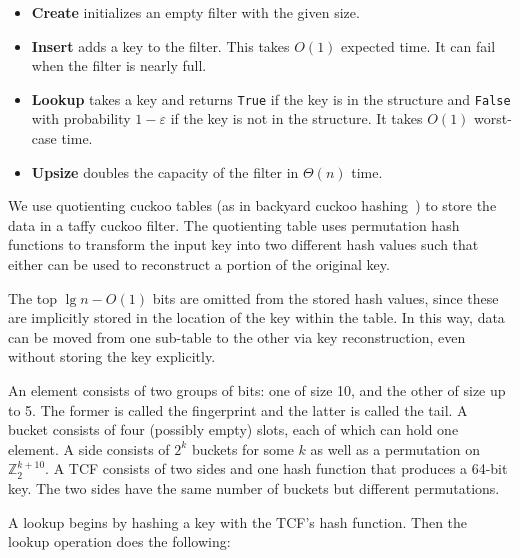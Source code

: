 \documentclass[manuscript,screen,review]{acmart}
\newcommand{\ints}{\mathbb{Z}}
\begin{document}
\begin{itemize}
\item {\bf Create} initializes an empty filter with the given size.
\item {\bf Insert} adds a key to the filter.
  This takes $O(1)$ expected time.
  It can fail when the filter is nearly full.
\item {\bf Lookup} takes a key and returns \verb|True| if the key is in the structure and \verb|False| with probability $1-\varepsilon$ if the key is not in the structure.
  It takes $O(1)$ worst-case time.
\item {\bf Upsize} doubles the capacity of the filter in $\Theta(n)$ time.
\end{itemize}

We use quotienting cuckoo tables (as in backyard cuckoo hashing~\cite{backyard}) to store the data in a taffy cuckoo filter.
The quotienting table uses permutation hash functions to transform the input key into two different hash values such that either can be used to reconstruct a portion of the original key.

The top $\lg n - O(1)$ bits are omitted from the stored hash values, since these are implicitly stored in the location of the key within the table.
In this way, data can be moved from one sub-table to the other via key reconstruction, even without storing the key explicitly.

An element consists of two groups of bits: one of size 10, and the other of size up to 5.
The former is called the fingerprint and the latter is called the tail.
A bucket consists of four (possibly empty) slots, each of which can hold one element.
A side consists of $2^k$ buckets for some $k$ as well as a permutation on $\ints_2^{k+10}$. %
A TCF consists of two sides and one hash function that produces a 64-bit key.
The two sides have the same number of buckets but different permutations.

A lookup begins by hashing a key with the TCF's hash function.
Then the lookup operation does the following:
\end{document}
